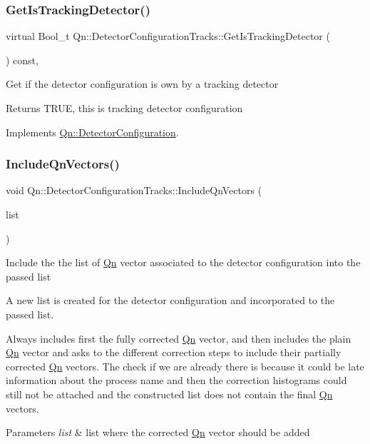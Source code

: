 \subsubsection{\texorpdfstring{Get\+Is\+Tracking\+Detector()}{GetIsTrackingDetector()}}
{\footnotesize\ttfamily virtual Bool\+\_\+t Qn\+::\+Detector\+Configuration\+Tracks\+::\+Get\+Is\+Tracking\+Detector (\begin{DoxyParamCaption}{ }\end{DoxyParamCaption}) const\hspace{0.3cm}{\ttfamily [inline]}, {\ttfamily [virtual]}}

Get if the detector configuration is own by a tracking detector \begin{DoxyReturn}{Returns}
T\+R\+UE, this is tracking detector configuration 
\end{DoxyReturn}


Implements \mbox{\hyperlink{classQn_1_1DetectorConfiguration_acdb57db96ed24524b5a3a28821727a3d}{Qn\+::\+Detector\+Configuration}}.

\mbox{\label{classQn_1_1DetectorConfigurationTracks_ac1c478bdcd744a466d0665eb6062317f}} 
\subsubsection{\texorpdfstring{Include\+Qn\+Vectors()}{IncludeQnVectors()}}
{\footnotesize\ttfamily void Qn\+::\+Detector\+Configuration\+Tracks\+::\+Include\+Qn\+Vectors (\begin{DoxyParamCaption}\item[{T\+List $\ast$}]{list }\end{DoxyParamCaption})\hspace{0.3cm}{\ttfamily [virtual]}}

Include the the list of \mbox{\hyperlink{namespaceQn}{Qn}} vector associated to the detector configuration into the passed list

A new list is created for the detector configuration and incorporated to the passed list.

Always includes first the fully corrected \mbox{\hyperlink{namespaceQn}{Qn}} vector, and then includes the plain \mbox{\hyperlink{namespaceQn}{Qn}} vector and asks to the different correction steps to include their partially corrected \mbox{\hyperlink{namespaceQn}{Qn}} vectors. The check if we are already there is because it could be late information about the process name and then the correction histograms could still not be attached and the constructed list does not contain the final \mbox{\hyperlink{namespaceQn}{Qn}} vectors. 
\begin{DoxyParams}{Parameters}
{\em list} & list where the corrected \mbox{\hyperlink{namespaceQn}{Qn}} vector should be added \\
\hline
\end{DoxyParams}


